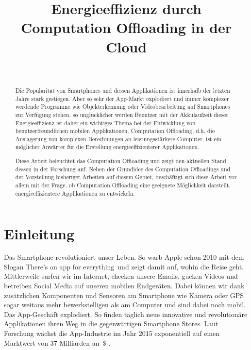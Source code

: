 \documentclass{sigchi}
\begin{document}
\title{Energieeffizienz durch Computation Offloading in der Cloud}

\author{
  \\
}

\maketitle

\begin{abstract}

Die Popularität von Smartphones und dessen Applikationen ist innerhalb der letzten Jahre stark gestiegen.
Aber so sehr der App-Markt explodiert und immer komplexer werdende Programme wie Objekterkennung oder Videobearbeitung auf Smartphones zur Verfügung stehen, so unglücklicher werden Benutzer mit der Akkulaufzeit dieser.
Energieeffizienz ist daher ein wichtiges Thema bei der Entwicklung von benutzerfreundlichen mobilen Applikationen.
Computation Offloading, d.h. die Auslagerung von komplexen Berechnungen an leistungsstärkere Computer, ist ein möglicher Anwärter für die Erstellung energieeffizienterer Applikationen.

Diese Arbeit beleuchtet das Computation Offloading und zeigt den aktuellen Stand dessen in der Forschung auf.
Neben der Grundidee des Computation Offloadings und der Vorstellung bisheriger Arbeiten auf diesem Gebiet, beschäftigt sich diese Arbeit vor allem mit der Frage, ob Computation Offloading eine geeignete Möglichkeit darstellt, energieeffizientere Applikationen zu entwickeln.
\end{abstract}

\section{Einleitung}

Das Smartphone revolutioniert unser Leben.
So warb Apple schon 2010 mit dem Slogan \glqq There's an app for everything\grqq\ und zeigt damit auf, wohin die Reise geht.
Mittlerweile surfen wir im Internet, checken unsere Emails, gucken Videos und betreiben Social Media auf unseren mobilen Endgeräten.
Dabei können wir dank zusätzlichen Komponenten und Sensoren am Smartphone wie Kamera oder GPS sogar weitaus mehr bewerkstelligen als am Computer und sind dabei noch mobil.
Das App-Geschäft explodiert.
So finden täglich neue innovative und revolutionäre Applikationen ihren Weg in die gegenwärtigen Smartphone Stores.
Laut Forschung wächst die App-Industrie im Jahr 2015 exponentiell auf einen Marktwert von 37 Milliarden an~\$ \cite{e3-1}.
\end{document}

